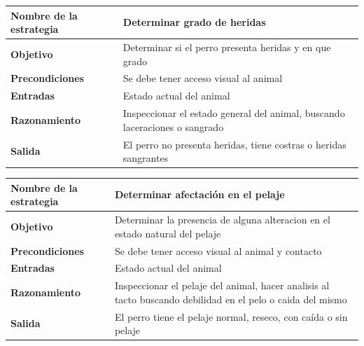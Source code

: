 \documentclass[a4paper,table,xcdraw]{article}
\begin{document}
\begin{longtable}{|l|l|}
\hline
\textbf{Nombre de la estrategia} & Determinar grado de heridas                                                 \\ \hline
\endhead
%
\textbf{Objetivo}                & Determinar si el perro presenta heridas y en que grado                      \\ \hline
\textbf{Precondiciones}          & Se debe tener acceso visual al animal                                       \\ \hline
\textbf{Entradas}                & Estado actual del animal                                                    \\ \hline
\textbf{Razonamiento}            & Inspeccionar el estado general del animal, buscando laceraciones o sangrado \\ \hline
\textbf{Salida}                  & El perro no presenta heridas, tiene costras o heridas sangrantes            \\ \hline
\end{longtable}

\begin{longtable}{|m{100pt}|m{300pt}|}
\hline
\textbf{Nombre de la estrategia} & Determinar afectación en el pelaje                                                                         \\ \hline
\endhead
%
\textbf{Objetivo}                & Determinar la presencia de alguna alteracion en el estado natural del pelaje                               \\ \hline
\textbf{Precondiciones}          & Se debe tener acceso visual al animal y contacto                                                           \\ \hline
\textbf{Entradas}                & Estado actual del animal                                                                                   \\ \hline
\textbf{Razonamiento}            & Inspeccionar el pelaje del animal, hacer analisis al tacto buscando debilidad en el pelo o caida del mismo \\ \hline
\textbf{Salida}                  & El perro tiene el pelaje normal, reseco, con caída o sin pelaje                                            \\ \hline
\end{longtable}
\end{document}

